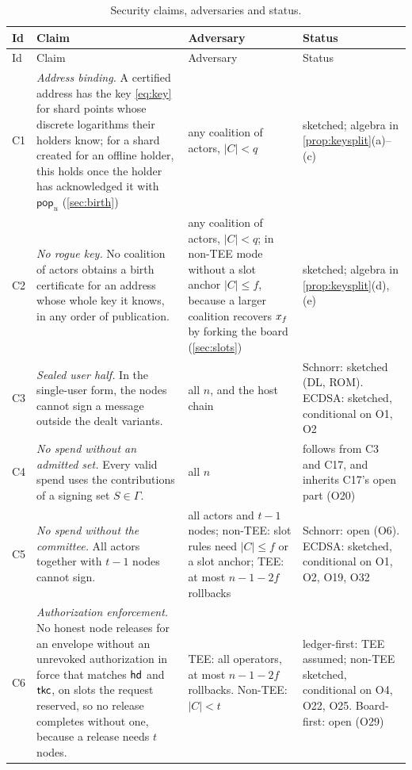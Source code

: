 {\small
\setlength{\LTpre}{6pt}\setlength{\LTpost}{6pt}
\begin{longtable}{@{}>{\raggedright\arraybackslash}p{0.6cm}>{\raggedright\arraybackslash}p{6.3cm}>{\raggedright\arraybackslash}p{3.6cm}>{\raggedright\arraybackslash}p{3.6cm}@{}}
\caption{Security claims, adversaries and status.}\label{tab:claims}\\
\toprule
Id & Claim & Adversary & Status \\
\midrule
\endfirsthead
\toprule
Id & Claim & Adversary & Status \\
\midrule
\endhead
\bottomrule
\endfoot
C1 & \emph{Address binding.} A certified address has the key \eqref{eq:key} for shard points whose discrete logarithms their holders know; for a shard created for an offline holder, this holds once the holder has acknowledged it with $\mathsf{pop}_u$ (\cref{sec:birth}) & any coalition of actors, $|C| < q$ & sketched; algebra in \cref{prop:keysplit}(a)--(c) \\
C2 & \emph{No rogue key.} No coalition of actors obtains a birth certificate for an address whose whole key it knows, in any order of publication. & any coalition of actors, $|C| < q$; in non-TEE mode without a slot anchor $|C| \le f$, because a larger coalition recovers $x_{f}$ by forking the board (\cref{sec:slots}) & sketched; algebra in \cref{prop:keysplit}(d), (e) \\
C3 & \emph{Sealed user half.} In the single-user form, the nodes cannot sign a message outside the dealt variants. & all $n$, and the host chain & Schnorr: sketched (DL, ROM). ECDSA: sketched, conditional on O1, O2 \\
C4 & \emph{No spend without an admitted set.} Every valid spend uses the contributions of a signing set $S \in \Gamma$. & all $n$ & follows from C3 and C17, and inherits C17's open part (O20) \\
C5 & \emph{No spend without the committee.} All actors together with $t - 1$ nodes cannot sign. & all actors and $t-1$ nodes; non-TEE: slot rules need $|C| \le f$ or a slot anchor; TEE: at most $n-1-2f$ rollbacks & Schnorr: open (O6). ECDSA: sketched, conditional on O1, O2, O19, O32 \\
C6 & \emph{Authorization enforcement.} No honest node releases for an envelope without an unrevoked authorization in force that matches $\mathsf{hd}$ and $\mathsf{tkc}$, on slots the request reserved, so no release completes without one, because a release needs $t$ nodes. & TEE: all operators, at most $n-1-2f$ rollbacks. Non-TEE: $|C| < t$ & ledger-first: TEE assumed; non-TEE sketched, conditional on O4, O22, O25. Board-first: open (O29) \\

\end{longtable}}
